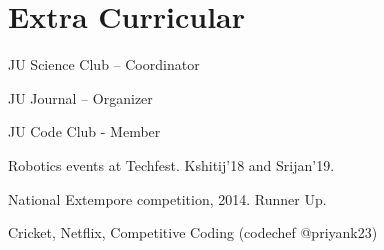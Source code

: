 \documentclass[]{deedy-resume-openfont}
\begin{document}
\begin{minipage}[t]{0.4\textwidth}
\section{Extra Curricular}
\sectionsep
\begin{tightemize}
    \item JU Science Club – Coordinator
    \item JU Journal – Organizer
    \item JU Code Club - Member
\end{tightemize}
\sectionsep
\begin{tightemize}
    \item Robotics events at Techfest. Kshitij’18 and Srijan’19.
    \item National Extempore competition, 2014. Runner Up.
\end{tightemize}
Cricket, Netflix, Competitive Coding (codechef @priyank23)
\sectionsep

\end{minipage} 
\end{document}
